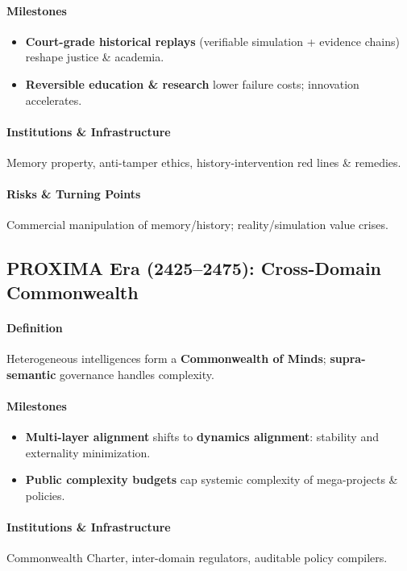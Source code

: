 \documentclass[11pt]{article}
\begin{document}
\paragraph{Milestones}
\begin{itemize}[noitemsep]
  \item \textbf{Court-grade historical replays} (verifiable simulation + evidence chains) reshape justice \& academia.
  \item \textbf{Reversible education \& research} lower failure costs; innovation accelerates.
\end{itemize}

\paragraph{Institutions \& Infrastructure} Memory property, anti-tamper ethics, history-intervention red lines \& remedies.

\paragraph{Risks \& Turning Points} Commercial manipulation of memory/history; reality/simulation value crises.

\subsection{PROXIMA Era (2425–2475): Cross-Domain Commonwealth}
\paragraph{Definition} Heterogeneous intelligences form a \textbf{Commonwealth of Minds}; \textbf{supra-semantic} governance handles complexity.

\paragraph{Milestones}
\begin{itemize}[noitemsep]
  \item \textbf{Multi-layer alignment} shifts to \textbf{dynamics alignment}: stability and externality minimization.
  \item \textbf{Public complexity budgets} cap systemic complexity of mega-projects \& policies.
\end{itemize}

\paragraph{Institutions \& Infrastructure} Commonwealth Charter, inter-domain regulators, auditable policy compilers.
\end{document}
